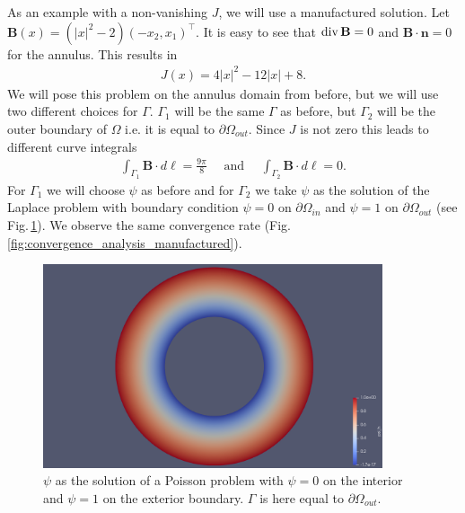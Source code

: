 \documentclass[../master_thesis.tex]{subfiles}
\begin{document}
As an example with a non-vanishing $J$, we will use a manufactured solution. 
Let $\mathbf{B}(x) = (|x|^2 -2) (-x_2,x_1)^\top$. It is easy to see that 
$\operatorname{div} \mathbf{B} = 0$ and 
$\mathbf{B}\cdot \mathbf{n} = 0$ for the annulus. 
This results in   
\begin{align*}
    J(x) = 4 |x|^2 - 12 |x| + 8.
\end{align*}
We will pose this problem on the annulus domain from before, but we will use two 
different choices for $\Gamma$. 
$\Gamma_1$ will be the same $\Gamma$ as before, but $\Gamma_2$ will 
be the outer boundary of $\Omega$ i.e. 
it is equal to $\partial\Omega_{out}$. 
Since $J$ is not zero this leads to different curve integrals
\begin{align*}
    \int_{\Gamma_1} \mathbf{B}\cdot d\ell = \frac{9\pi}{8} \quad \text{  and  } \quad
    \int_{\Gamma_2} \mathbf{B}\cdot d\ell = 0.
\end{align*}
For $\Gamma_1$ we will choose $\psi$ as before and for $\Gamma_2$ we take
$\psi$ as the solution of the Laplace problem with boundary condition 
$\psi=0$ on $\partial\Omega_{in}$ and $\psi=1$ on $\partial\Omega_{out}$
(see Fig.\,\ref{fig:psi_poisson}). We observe the same convergence rate 
(Fig.\,\ref{fig:convergence_analysis_manufactured}).

\begin{figure}
    \centering 
    \includegraphics[width=10cm]{plot_files/manufactured_poisson_psi/psi_h.png}
    \caption{$\psi$ as the solution of a Poisson problem with $\psi=0$ 
    on the interior and $\psi = 1$ on the exterior boundary. $\Gamma$ 
    is here equal to $\partial \Omega_{out}$.}
    \label{fig:psi_poisson}
\end{figure}
\end{document}
